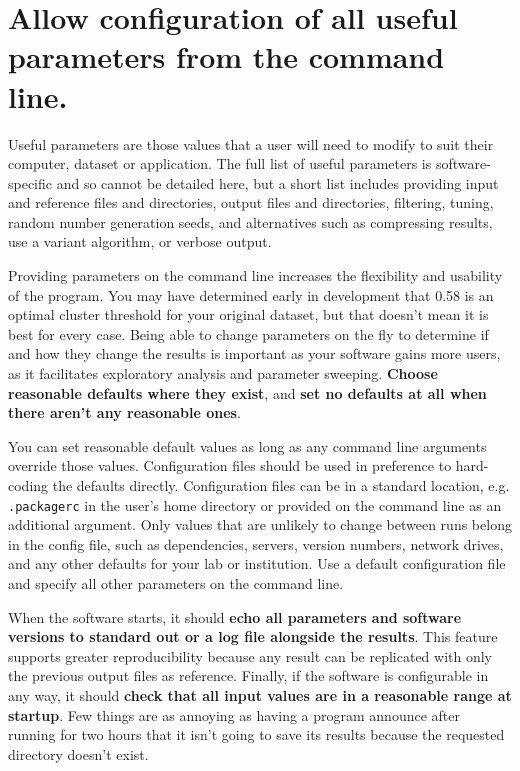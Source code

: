 \documentclass[10pt,letterpaper]{article}
\begin{document}
\section{Allow configuration of all useful parameters from the command line.}

Useful parameters are those values that a user will need to modify to suit
their computer, dataset or application. 
The full list of useful parameters is software-specific and so cannot be
detailed here, but a short list includes providing
input and reference files and directories,
output files and directories,
filtering,
tuning,
random number generation seeds,
and
alternatives such as compressing results,
use a variant algorithm,
or verbose output.

Providing parameters on the
command line increases the flexibility and usability of the program. You
may have determined early in development that 0.58 is an optimal cluster threshold for your
original dataset, but that doesn't mean it is best for every
case. Being able to change parameters on the fly to determine if and how
they change the results is important as your software gains more users,
as it facilitates exploratory analysis and parameter sweeping.
\textbf{Choose reasonable defaults where they exist},
and \textbf{set no defaults at all when there aren't any reasonable ones}.

You can set reasonable default values
as long as any command line arguments
override those values. Configuration files should be used in preference
to hard-coding the defaults directly. Configuration files can be in a standard
location, e.g. \texttt{.packagerc} in the user's home directory or
provided on the command line as an additional argument.
Only values that are unlikely to
change between runs belong in the config file, such as dependencies,
servers, version numbers, network drives, and any other defaults for
your lab or institution. 
Use a default configuration file and specify all other parameters on the
command line.

When the software starts, it should \textbf{echo all parameters and software
versions to standard out or a log file alongside the results}. This
feature supports greater reproducibility because any result can be
replicated with only the previous output files as reference.
Finally,
if the software is configurable in any way,
it should \textbf{check that all input values are in a reasonable range at startup}. 
Few things are as annoying as having a program announce after running for two hours
that it isn't going to save its results
because the requested directory doesn't exist.
\end{document}
